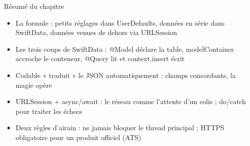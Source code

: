 \begin{tcbsummary}{Résumé du chapitre}
\begin{itemize}
  \item La formule : petits réglages dans UserDefaults, données en série dans SwiftData, données venues de dehors via URLSession
  \item Les trois coups de SwiftData : @Model déclare la table, modelContainer accroche le conteneur, @Query lit et context.insert écrit
  \item Codable « traduit » le JSON automatiquement : champs concordants, la magie opère
  \item URLSession + async/await : le réseau comme l'attente d'un colis ; do/catch pour traiter les échecs
  \item Deux règles d'airain : ne jamais bloquer le thread principal ; HTTPS obligatoire pour un produit officiel (ATS)
\end{itemize}

\end{tcbsummary}
